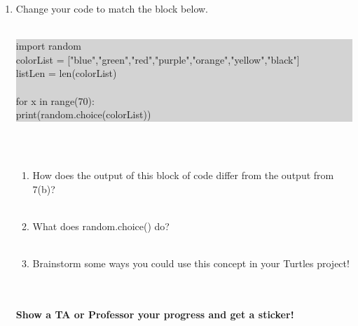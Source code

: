 \documentclass[11pt, letterpaper, onecolumn, oneside, final]{article}
\begin{document}
\begin{enumerate}
    \item Change your code to match the block below.\\
    \\
    \colorbox{lightgray}{\parbox{.88\textwidth}{\consolas import random\\
    colorList = ["blue","green","red","purple","orange","yellow","black"]\\
    listLen = len(colorList)\\
    \\
    for x in range(70):\\
    \hspace*{6mm} print(random.choice(colorList))}}\\
    \\
    \begin{enumerate}
        \item How does the output of this block of code differ from the output from 7(b)? \\\\
        \item What does random.choice() do?\\\\
        \item Brainstorm some ways you could use this concept in your Turtles project!\\
        \\\\
    \end{enumerate}
\textbf{Show a TA or Professor your progress and get a sticker!}

\end{enumerate}
\end{document}
